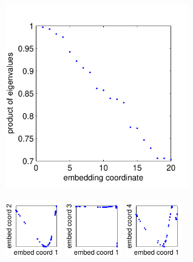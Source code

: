 \documentclass[10pt]{article}
\begin{document}
\includegraphics[width=8cm]{zebrafish_eval_spectrum}

\includegraphics[width=2.5cm]{zebrafish_evec_corr1}
\includegraphics[width=2.5cm]{zebrafish_evec_corr2}
\includegraphics[width=2.5cm]{zebrafish_evec_corr3}
\end{document}
